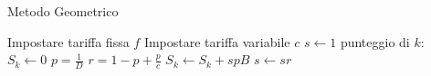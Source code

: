 \begin{algorithm}
    \caption{Metodo Geometrico}
    \label{alg_metodo_geometrico}
    \begin{algorithmic}
      \STATE Impostare tariffa fissa $f$
      \STATE Impostare tariffa variabile $c$
        \STATE $s \leftarrow 1$
          \STATE punteggio di $k$: $S_k \leftarrow 0$
        \ENDFOR
        \REPEAT
            \STATE $p = \frac{1}{D}$
            \STATE $r = 1 - p + \frac{p}{c}$
          \ENDIF
            \STATE $S_k \leftarrow S_k + spB$
            \STATE $s \leftarrow sr$
          \ENDIF
        \ENDFOR
      \ENDFOR
    \end{algorithmic}
\end{algorithm}
